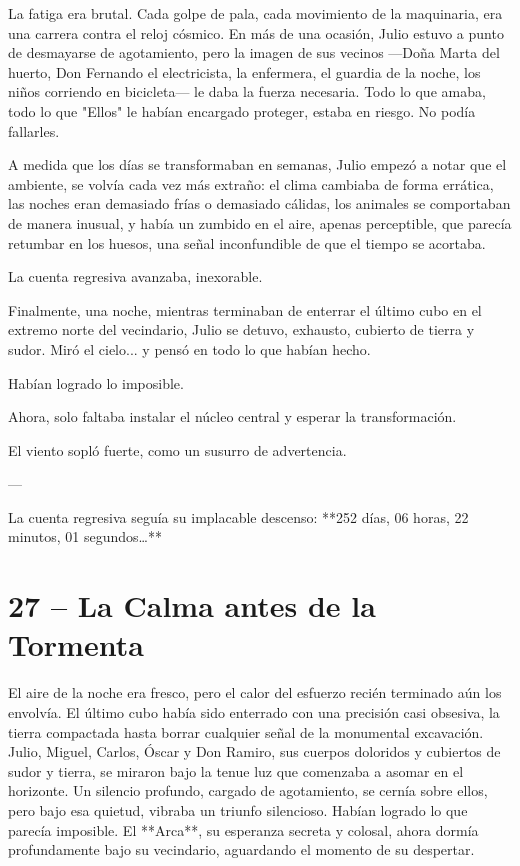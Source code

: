 \documentclass[a4paper,12pt]{book}
\begin{document}
La fatiga era brutal. Cada golpe de pala, cada movimiento de la maquinaria, era una carrera contra el reloj cósmico. En más de una ocasión, Julio estuvo a punto de desmayarse de agotamiento, pero la imagen de sus vecinos —Doña Marta del huerto, Don Fernando el electricista, la enfermera, el guardia de la noche, los niños corriendo en bicicleta— le daba la fuerza necesaria. Todo lo que amaba, todo lo que "Ellos" le habían encargado proteger, estaba en riesgo. No podía fallarles.

A medida que los días se transformaban en semanas, Julio empezó a notar que el ambiente, se volvía cada vez más extraño: el clima cambiaba de forma errática, las noches eran demasiado frías o demasiado cálidas, los animales se comportaban de manera inusual, y había un zumbido en el aire, apenas perceptible, que parecía retumbar en los huesos, una señal inconfundible de que el tiempo se acortaba.

La cuenta regresiva avanzaba, inexorable.

Finalmente, una noche, mientras terminaban de enterrar el último cubo en el extremo norte del vecindario, Julio se detuvo, exhausto, cubierto de tierra y sudor. Miró el cielo... y pensó en todo lo que habían hecho.

Habían logrado lo imposible.

Ahora, solo faltaba instalar el núcleo central y esperar la transformación.

El viento sopló fuerte, como un susurro de advertencia.

---

La cuenta regresiva seguía su implacable descenso: **252 días, 06 horas, 22 minutos, 01 segundos…**

\cleardoublepage %

\chapter*{27 – La Calma antes de la Tormenta}

El aire de la noche era fresco, pero el calor del esfuerzo recién terminado aún los envolvía. El último cubo había sido enterrado con una precisión casi obsesiva, la tierra compactada hasta borrar cualquier señal de la monumental excavación. Julio, Miguel, Carlos, Óscar y Don Ramiro, sus cuerpos doloridos y cubiertos de sudor y tierra, se miraron bajo la tenue luz que comenzaba a asomar en el horizonte. Un silencio profundo, cargado de agotamiento, se cernía sobre ellos, pero bajo esa quietud, vibraba un triunfo silencioso. Habían logrado lo que parecía imposible. El **Arca**, su esperanza secreta y colosal, ahora dormía profundamente bajo su vecindario, aguardando el momento de su despertar.
\end{document}
